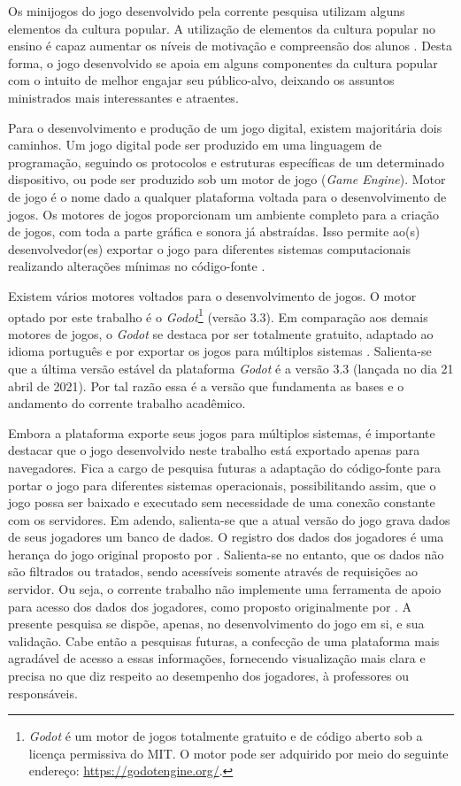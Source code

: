 Os minijogos do jogo desenvolvido pela corrente pesquisa utilizam alguns elementos da cultura popular. A utilização de elementos da cultura popular no ensino é capaz aumentar os níveis de motivação e compreensão dos alunos \cite{giroux1988schooling, cheung2001use, duncan2004your, chik2011learner}. Desta forma, o jogo desenvolvido se apoia em alguns componentes da cultura popular com o intuito de melhor engajar seu público-alvo, deixando os assuntos ministrados mais interessantes e atraentes. 

Para o desenvolvimento e produção de um jogo digital, existem majoritária dois caminhos. Um jogo digital pode ser produzido em uma linguagem de programação, seguindo os protocolos e estruturas específicas de um determinado dispositivo, ou pode ser produzido sob um motor de jogo (\textit{Game Engine}). Motor de jogo é o nome dado a qualquer plataforma voltada para o desenvolvimento de jogos. Os motores de jogos proporcionam um ambiente completo para a criação de jogos, com toda a parte gráfica e sonora já abstraídas. Isso permite ao(s) desenvolvedor(es) exportar o jogo para diferentes sistemas computacionais realizando alterações mínimas no código-fonte \cite{bishop1998designing, machado2009serious}.

Existem vários motores voltados para o desenvolvimento de jogos. O motor optado por este trabalho é o \textit{Godot}\footnote{\textit{Godot} é um motor de jogos totalmente gratuito e de código aberto sob a licença permissiva do MIT. O motor pode ser adquirido por meio do seguinte endereço: \url{https://godotengine.org/}.} (versão 3.3). Em comparação aos demais motores de jogos, o \textit{Godot} se destaca por ser totalmente gratuito, adaptado ao idioma português e por exportar os jogos para múltiplos sistemas \cite{scherer2020analise}. Salienta-se que a última versão estável da plataforma \textit{Godot} é a versão 3.3 (lançada no dia 21 abril de 2021). Por tal razão essa é a versão que fundamenta as bases e o andamento do corrente trabalho acadêmico. 

Embora a plataforma exporte seus jogos para múltiplos sistemas, é importante destacar que o jogo desenvolvido neste trabalho está exportado apenas para navegadores. Fica a cargo de pesquisa futuras a adaptação do código-fonte para portar o jogo para diferentes sistemas operacionais, possibilitando assim, que o jogo possa ser baixado e executado sem necessidade de uma conexão constante com os servidores. Em adendo, salienta-se que a atual versão do jogo grava dados de seus jogadores um banco de dados. O registro dos dados dos jogadores é uma herança do jogo original proposto por . Salienta-se no entanto, que os dados não são filtrados ou tratados, sendo acessíveis somente através de requisições ao servidor. Ou seja, o corrente trabalho não implemente uma ferramenta de apoio para acesso dos dados dos jogadores, como proposto originalmente por . A presente pesquisa se dispõe, apenas, no desenvolvimento do jogo em si, e sua validação. Cabe então a pesquisas futuras, a confecção de uma plataforma mais agradável de acesso a essas informações, fornecendo visualização mais clara e precisa no que diz respeito ao desempenho dos jogadores, à professores ou responsáveis. 


